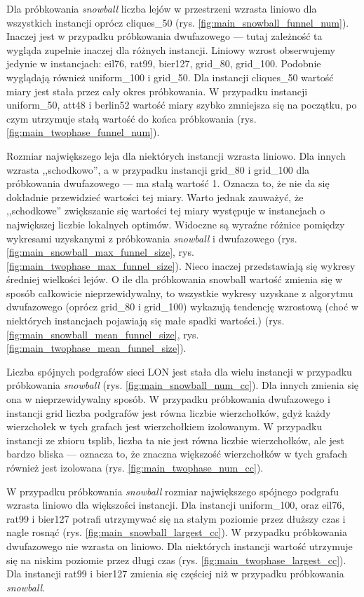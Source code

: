 Dla próbkowania \textit{snowball} liczba lejów w przestrzeni wzrasta liniowo dla wszystkich instancji oprócz cliques\_50 (rys. \ref{fig:main_snowball_funnel_num}).
Inaczej jest w przypadku próbkowania dwufazowego --- tutaj zależność ta wygląda zupełnie inaczej dla różnych instancji.
Liniowy wzrost obserwujemy jedynie w instancjach: eil76, rat99, bier127, grid\_80, grid\_100. Podobnie wyglądają również uniform\_100 i grid\_50.
Dla instancji cliques\_50 wartość miary jest stała przez cały okres próbkowania. W przypadku instancji uniform\_50, att48 i berlin52 wartość miary
szybko zmniejsza się na początku, po czym utrzymuje stałą wartość do końca próbkowania (rys. \ref{fig:main_twophase_funnel_num}).

Rozmiar największego leja dla niektórych instancji wzrasta liniowo. Dla innych wzrasta ,,schodkowo'', a w przypadku instancji grid\_80 i grid\_100 dla
próbkowania dwufazowego --- ma stałą wartość 1. Oznacza to, że nie da się dokładnie przewidzieć wartości tej miary. Warto jednak zauważyć, że
,,schodkowe'' zwiększanie się wartości tej miary występuje w instancjach o największej liczbie lokalnych optimów.
Widoczne są wyraźne różnice pomiędzy wykresami uzyskanymi z próbkowania \textit{snowball} i dwufazowego (rys. \ref{fig:main_snowball_max_funnel_size}, rys. \ref{fig:main_twophase_max_funnel_size}).
Nieco inaczej przedstawiają się wykresy średniej wielkości lejów. O ile dla próbkowania snowball wartość zmienia się w sposób całkowicie nieprzewidywalny,
to wszystkie wykresy uzyskane z algorytmu dwufazowego (oprócz grid\_80 i grid\_100) wykazują tendencję wzrostową (choć w niektórych instancjach pojawiają się małe spadki wartości.)
(rys. \ref{fig:main_snowball_mean_funnel_size}, rys. \ref{fig:main_twophase_mean_funnel_size}).

Liczba spójnych podgrafów sieci LON jest stała dla wielu instancji w przypadku próbkowania \textit{snowball} (rys. \ref{fig:main_snowball_num_cc}). Dla innych zmienia się ona w nieprzewidywalny sposób.
W przypadku próbkowania dwufazowego i instancji grid liczba podgrafów jest równa liczbie wierzchołków, gdyż każdy wierzchołek w tych grafach jest wierzchołkiem izolowanym.
W przypadku instancji ze zbioru tsplib, liczba ta nie jest równa liczbie wierzchołków, ale jest bardzo bliska --- oznacza to, że znaczna większość
wierzchołków w tych grafach również jest izolowana (rys. \ref{fig:main_twophase_num_cc}).

W przypadku próbkowania \textit{snowball} rozmiar największego spójnego podgrafu wzrasta liniowo dla większości instancji. Dla instancji uniform\_100, oraz
eil76, rat99 i bier127 potrafi utrzymywać się na stałym poziomie przez dłuższy czas i nagle rosnąć (rys. \ref{fig:main_snowball_largest_cc}).
W przypadku próbkowania dwufazowego nie wzrasta on liniowo. Dla niektórych instancji wartość utrzymuje się na niskim poziomie przez długi czas (rys. \ref{fig:main_twophase_largest_cc}).
Dla instancji rat99 i bier127 zmienia się częściej niż w przypadku próbkowania \textit{snowball}.

